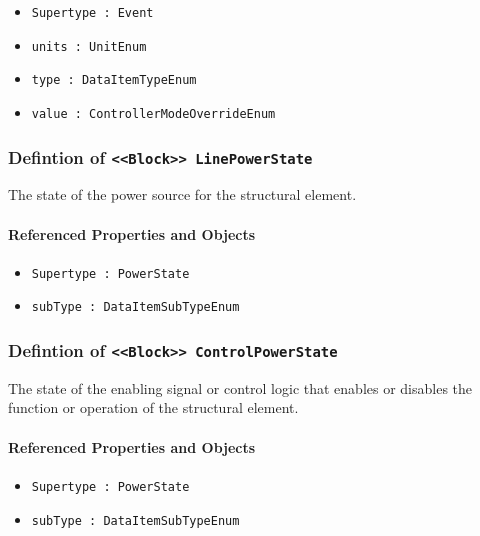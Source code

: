 \begin{itemize}
\item \texttt{Supertype : Event}

\item \texttt{units : UnitEnum}

\item \texttt{type : DataItemTypeEnum}

\item \texttt{value : ControllerModeOverrideEnum}

\end{itemize}
\FloatBarrier
\subsubsection{Defintion of \texttt{<<Block>> LinePowerState}}
  \label{type:LinePowerState}

\FloatBarrier

The state of the power source for the structural element.

\FloatBarrier
\paragraph{Referenced Properties and Objects}

\begin{itemize}
\item \texttt{Supertype : PowerState}

\item \texttt{subType : DataItemSubTypeEnum}

\end{itemize}
\FloatBarrier
\subsubsection{Defintion of \texttt{<<Block>> ControlPowerState}}
  \label{type:ControlPowerState}

\FloatBarrier

The state of the enabling signal or control logic that enables or disables the function or operation of the structural element.

\FloatBarrier
\paragraph{Referenced Properties and Objects}

\begin{itemize}
\item \texttt{Supertype : PowerState}

\item \texttt{subType : DataItemSubTypeEnum}

\end{itemize}
\FloatBarrier

